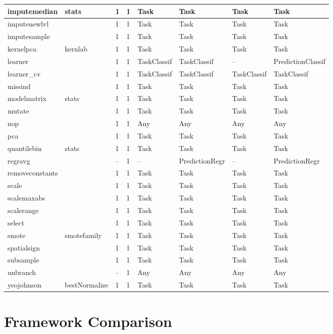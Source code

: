 \documentclass[]{scrbook}
\begin{document}
\begin{table}[H]
\begin{tabular}{l|l|l|l|l|l|l|l}
\hline
imputemedian & stats & 1 & 1 & Task & Task & Task & Task\\
\hline
imputenewlvl &  & 1 & 1 & Task & Task & Task & Task\\
\hline
imputesample &  & 1 & 1 & Task & Task & Task & Task\\
\hline
kernelpca & kernlab & 1 & 1 & Task & Task & Task & Task\\
\hline
learner &  & 1 & 1 & TaskClassif & TaskClassif & -- & PredictionClassif\\
\hline
learner\_cv &  & 1 & 1 & TaskClassif & TaskClassif & TaskClassif & TaskClassif\\
\hline
missind &  & 1 & 1 & Task & Task & Task & Task\\
\hline
modelmatrix & stats & 1 & 1 & Task & Task & Task & Task\\
\hline
mutate &  & 1 & 1 & Task & Task & Task & Task\\
\hline
nop &  & 1 & 1 & Any & Any & Any & Any\\
\hline
pca &  & 1 & 1 & Task & Task & Task & Task\\
\hline
quantilebin & stats & 1 & 1 & Task & Task & Task & Task\\
\hline
regravg &  & -- & 1 & -- & PredictionRegr & -- & PredictionRegr\\
\hline
removeconstants &  & 1 & 1 & Task & Task & Task & Task\\
\hline
scale &  & 1 & 1 & Task & Task & Task & Task\\
\hline
scalemaxabs &  & 1 & 1 & Task & Task & Task & Task\\
\hline
scalerange &  & 1 & 1 & Task & Task & Task & Task\\
\hline
select &  & 1 & 1 & Task & Task & Task & Task\\
\hline
smote & smotefamily & 1 & 1 & Task & Task & Task & Task\\
\hline
spatialsign &  & 1 & 1 & Task & Task & Task & Task\\
\hline
subsample &  & 1 & 1 & Task & Task & Task & Task\\
\hline
unbranch &  & -- & 1 & Any & Any & Any & Any\\
\hline
yeojohnson & bestNormalize & 1 & 1 & Task & Task & Task & Task\\
\hline
\end{tabular}
\endgroup{}
\end{table}

\hypertarget{compare-frameworks}{%
\section{Framework Comparison}\label{compare-frameworks}}
\end{document}
